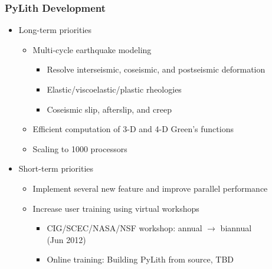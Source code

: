 \documentclass{beamer}
\begin{document}
\begin{frame}
  \frametitle{PyLith Development}
  \summary{}

  \begin{itemize}
  \item Long-term priorities
    \begin{itemize}
    \item Multi-cycle earthquake modeling
      \begin{itemize}
      \item Resolve interseismic, coseismic, and postseismic deformation
      \item Elastic/viscoelastic/plastic rheologies
      \item Coseismic slip, afterslip, and creep
      \end{itemize}
   \item Efficient computation of 3-D and 4-D Green's functions
    \item Scaling to 1000 processors
   \end{itemize}
  \item Short-term priorities
    \begin{itemize}
    \item Implement several new feature and improve parallel
      performance
    \item Increase user training using virtual workshops
    \begin{itemize}
      \item CIG/SCEC/NASA/NSF workshop: annual $\rightarrow$ biannual\\
        (Jun 2012)
      \item Online training: Building PyLith from source, TBD
      \end{itemize}
    \end{itemize}
  \end{itemize}

\end{frame}
\end{document}
